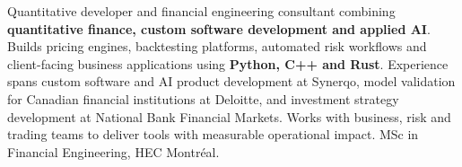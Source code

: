 
\begin{cvparagraph}

Quantitative developer and financial engineering consultant combining \textbf{quantitative finance, custom software development and applied AI}. Builds pricing engines, backtesting platforms, automated risk workflows and client-facing business applications using \textbf{Python, C++ and Rust}. Experience spans custom software and AI product development at Synerqo, model validation for Canadian financial institutions at Deloitte, and investment strategy development at National Bank Financial Markets. Works with business, risk and trading teams to deliver tools with measurable operational impact. MSc in Financial Engineering, HEC Montr\'eal.

\end{cvparagraph}
